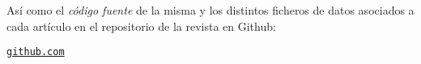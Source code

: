 \begin{textblock}{20}
{\begin{minipage}{.45\linewidth}
{{Así como el {\em código fuente} de la misma y los distintos ficheros de datos asociados a cada artículo en el repositorio de la revista en Github:\\
\begin{center}
	{\tt \href{https://github.com/GLUD/GLUD_Magazine/}{github.com}}
\end{center}


}}

\bigskip

\end{minipage}
}


\end{textblock}

\pagebreak